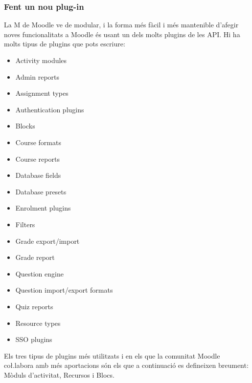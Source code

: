 \documentclass[a4paper]{report}  %
\begin{document}
\subsubsection{Fent un nou plug-in}
La M de Moodle ve de modular, i la forma més fàcil i més mantenible d'afegir noves funcionalitats a Moodle és usant un dels molts plugins de les API. Hi ha molts tipus de plugins que pots escriure: 
\begin{itemize}
\item Activity modules 
\item Admin reports 
\item Assignment types 
\item Authentication plugins 
\item Blocks 
\item Course formats 
\item Course reports 
\item Database fields 
\item Database presets 
\item Enrolment plugins 
\item Filters 
\item Grade export/import 
\item Grade report 
\item Question engine 
\item Question import/export formats 
\item Quiz reports 
\item Resource types 
\item SSO plugins 
\end{itemize}
Els tres tipus de plugins més utilitzats i en els que la comunitat Moodle co\l.labora amb més aportacions són els que a continuació es defineixen breument: Mòduls d'activitat, Recursos i Blocs.
\end{document}
